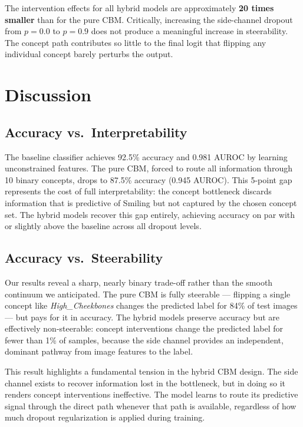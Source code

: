 \documentclass[11pt,a4paper]{article}
\begin{document}
The intervention effects for all hybrid models are approximately \textbf{20 times smaller} than for the pure CBM. Critically, increasing the side-channel dropout from $p = 0.0$ to $p = 0.9$ does not produce a meaningful increase in steerability. The concept path contributes so little to the final logit that flipping any individual concept barely perturbs the output.


\section{Discussion}

\subsection{Accuracy vs.\ Interpretability}

The baseline classifier achieves 92.5\% accuracy and 0.981 AUROC by learning unconstrained features. The pure CBM, forced to route all information through 10 binary concepts, drops to 87.5\% accuracy (0.945 AUROC). This 5-point gap represents the cost of full interpretability: the concept bottleneck discards information that is predictive of Smiling but not captured by the chosen concept set. The hybrid models recover this gap entirely, achieving accuracy on par with or slightly above the baseline across all dropout levels.

\subsection{Accuracy vs.\ Steerability}

Our results reveal a sharp, nearly binary trade-off rather than the smooth continuum we anticipated. The pure CBM is fully steerable --- flipping a single concept like \emph{High\_Cheekbones} changes the predicted label for 84\% of test images --- but pays for it in accuracy. The hybrid models preserve accuracy but are effectively non-steerable: concept interventions change the predicted label for fewer than 1\% of samples, because the side channel provides an independent, dominant pathway from image features to the label.

This result highlights a fundamental tension in the hybrid CBM design. The side channel exists to recover information lost in the bottleneck, but in doing so it renders concept interventions ineffective. The model learns to route its predictive signal through the direct path whenever that path is available, regardless of how much dropout regularization is applied during training.
\end{document}
